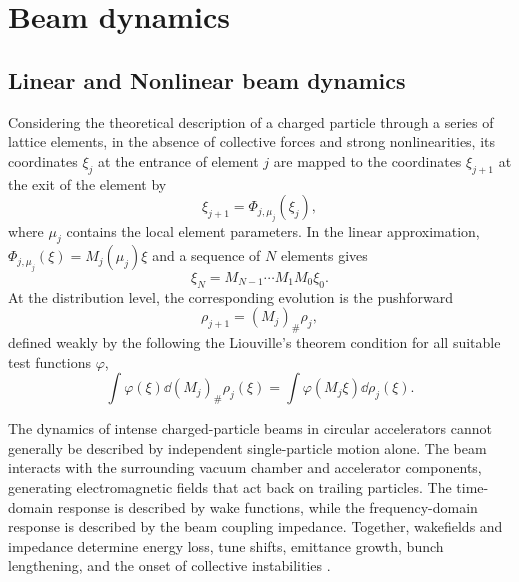 
\section{Beam dynamics}
\label{sec:beam_dynamics_data}

\subsection{Linear and Nonlinear beam dynamics}

Considering the theoretical description of a charged particle through a series of lattice elements, in the absence of collective forces and strong nonlinearities, its coordinates $\xi_j$ at the entrance of element $j$ are mapped to the coordinates $\xi_{j+1}$ at the exit of the element by
\begin{equation}
    \xi_{j+1}=\Phi_{j,\mu_j}(\xi_j),
    \label{eq:single_particle_map}
\end{equation}
where $\mu_j$ contains the local element parameters. In the linear approximation, $\Phi_{j,\mu_j}(\xi)=M_j(\mu_j)\xi$ and a sequence of $N$ elements gives
\begin{equation}
    \xi_N=M_{N-1}\cdots M_1M_0\xi_0.
    \label{eq:linear_particle_transport}
\end{equation}
At the distribution level, the corresponding evolution is the pushforward
\begin{equation}
    \rho_{j+1}=(M_j)_\#\rho_j,
    \label{eq:linear_pushforward}
\end{equation}
defined weakly by the following the Liouville's theorem condition for all suitable test functions $\varphi$,
\begin{equation}
    \int \varphi(\xi)\dd (M_j)_\#\rho_j(\xi)=\int \varphi(M_j\xi)\dd\rho_j(\xi).
\end{equation}

The dynamics of intense charged-particle beams in circular accelerators cannot generally be described by independent single-particle motion alone. The beam interacts with the surrounding vacuum chamber and accelerator components, generating electromagnetic fields that act back on trailing particles. The time-domain response is described by wake functions, while the frequency-domain response is described by the beam coupling impedance. Together, wakefields and impedance determine energy loss, tune shifts, emittance growth, bunch lengthening, and the onset of collective instabilities \cite{metral_wake_2021}.

